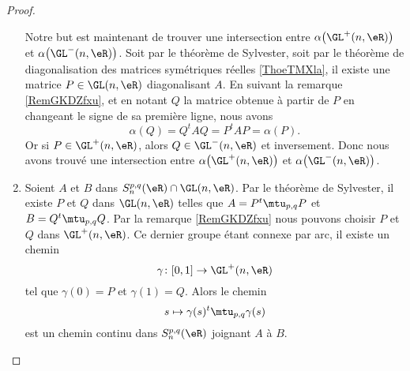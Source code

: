 \begin{proof}
\begin{enumerate}
            Notre but est maintenant de trouver une intersection entre \( \alpha\big( \GL^+(n,\eR) \big)\) et \( \alpha\big( \GL^-(n,\eR) \big)\). Soit par le théorème de Sylvester, soit par le théorème de diagonalisation des matrices symétriques réelles \ref{ThoeTMXla}, il existe une matrice \( P\in \GL(n,\eR)\) diagonalisant \( A\). En suivant la remarque \ref{RemGKDZfxu}, et en notant \( Q\) la matrice obtenue à partir de \( P\) en changeant le signe de sa première ligne, nous avons
            \begin{equation}
                \alpha(Q)=Q^tAQ=P^tAP=\alpha(P).
            \end{equation}
            Or si \( P\in \GL^+(n,\eR)\), alors \( Q\in \GL^-(n,\eR)\) et inversement. Donc nous avons trouvé une intersection entre \( \alpha\big( \GL^+(n,\eR) \big)\) et \( \alpha\big( \GL^-(n,\eR) \big)\).

        \item

            Soient \( A\) et \( B\) dans \( S_n^{p,q}(\eR)\cap\GL(n,\eR)\). Par le théorème de Sylvester, il existe \( P\) et \( Q\) dans \( \GL(n,\eR)\) telles que \( A=P^t\mtu_{p,q}P\) et \( B=Q^t\mtu_{p,q}Q\). Par la remarque \ref{RemGKDZfxu} nous pouvons choisir \( P\) et \( Q\) dans \( \GL^+(n,\eR)\). Ce dernier groupe étant connexe par arc, il existe un chemin
            \begin{equation}
                    \gamma\colon \mathopen[ 0 , 1 \mathclose]\to \GL^+(n,\eR) 
            \end{equation}
            tel que \( \gamma(0)=P\) et \( \gamma(1)=Q\). Alors le chemin
            \begin{equation}
                s\mapsto \gamma(s)^t\mtu_{p,q}\gamma(s)
            \end{equation}
            est un chemin continu dans \( S_n^{p,q}(\eR)\) joignant \( A\) à \( B\).
    \end{enumerate}
\end{proof}

